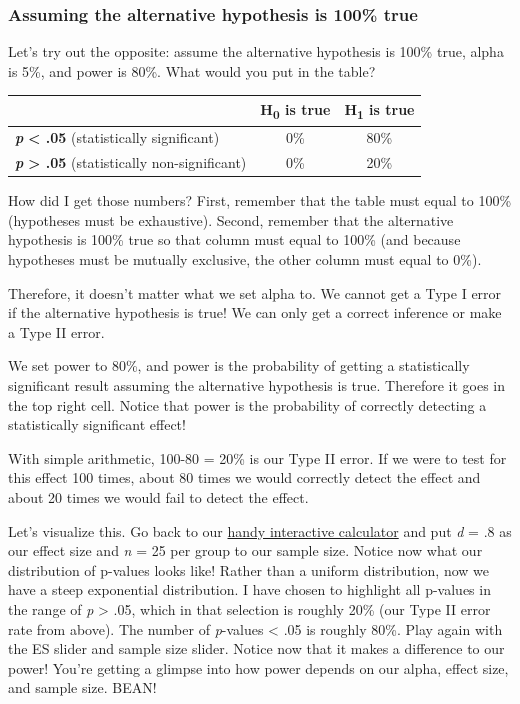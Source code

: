 \documentclass[
]{book}
\begin{document}
\hypertarget{assuming-the-alternative-hypothesis-is-100-true}{%
\subsubsection{Assuming the alternative hypothesis is 100\% true}\label{assuming-the-alternative-hypothesis-is-100-true}}

Let's try out the opposite: assume the alternative hypothesis is 100\% true, alpha is 5\%, and power is 80\%. What would you put in the table?

\begin{longtable}[]{@{}lcc@{}}
\toprule
& H\textsubscript{0} is true & H\textsubscript{1} is true \\
\midrule
\endhead
\textbf{\emph{p}} \textbf{\textless{} .05} (statistically significant) & 0\% & 80\% \\
\textbf{\emph{p}} \textbf{\textgreater{} .05} (statistically non-significant) & 0\% & 20\% \\
\bottomrule
\end{longtable}

How did I get those numbers? First, remember that the table must equal to 100\% (hypotheses must be exhaustive). Second, remember that the alternative hypothesis is 100\% true so that column must equal to 100\% (and because hypotheses must be mutually exclusive, the other column must equal to 0\%).

Therefore, it doesn't matter what we set alpha to. We cannot get a Type I error if the alternative hypothesis is true! We can only get a correct inference or make a Type II error.

We set power to 80\%, and power is the probability of getting a statistically significant result assuming the alternative hypothesis is true. Therefore it goes in the top right cell. Notice that power is the probability of correctly detecting a statistically significant effect!

With simple arithmetic, 100-80 = 20\% is our Type II error. If we were to test for this effect 100 times, about 80 times we would correctly detect the effect and about 20 times we would fail to detect the effect.

Let's visualize this. Go back to our \href{https://rpsychologist.com/d3/pdist/}{handy interactive calculator} and put \emph{d} = .8 as our effect size and \emph{n} = 25 per group to our sample size. Notice now what our distribution of p-values looks like! Rather than a uniform distribution, now we have a steep exponential distribution. I have chosen to highlight all p-values in the range of \emph{p} \textgreater{} .05, which in that selection is roughly 20\% (our Type II error rate from above). The number of \emph{p}-values \textless{} .05 is roughly 80\%. Play again with the ES slider and sample size slider. Notice now that it makes a difference to our power! You're getting a glimpse into how power depends on our alpha, effect size, and sample size. BEAN!
\end{document}
